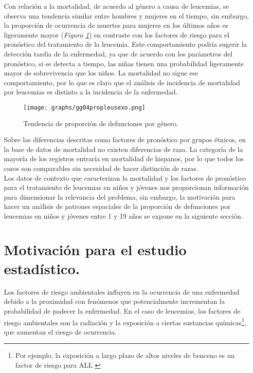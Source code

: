 \documentclass[11pt, oneside]{book}
\begin{document}
Con relación a la mortalidad, de acuerdo al género a causa de leucemias, se observa una tendencia similar entre hombres y mujeres en el tiempo, sin embargo, la proporción de ocurrencia de muertes para mujeres en los últimos años es ligeramente mayor (\emph{Figura \ref{fig3.sexo}}) en contraste con los factores de riesgo para el pronóstico del tratamiento de la leucemia. Este comportamiento podría sugerir la detección tardía de la enfermedad, ya que de acuerdo con los parámetros del pronóstico, si se detecta a tiempo, las niñas tienen una probabilidad ligeramente mayor de sobrevivencia que los niños. La mortalidad no sigue ese comportamiento, por lo que es claro que el análisis de incidencia de mortalidad por leucemias es distinto a la incidencia de la enfermedad. \\

\begin{figure}[ht]
	  \centering
	  \texttt{[image: graphs/gg04propleusexo.png]}
  \caption{Tendencia de proporción de defunciones por género.}
  \label{fig3.sexo}
\end{figure}

Sobre las diferencias descritas como factores de pronóstico por grupos étnicos, en la base de datos de mortalidad no existen diferencias de raza. La categoría de la mayoría de los registros entraría en mortalidad de hispanos, por lo que todos los casos son comparables sin necesidad de hacer distinción de razas.\\

Los datos de contexto que caracterizan la mortalidad y los factores de pronóstico para el tratamiento de leucemias en niños y jóvenes nos proporcionan información para dimensionar la relevancia del problema, sin embargo, la motivación para hacer un análisis de patrones espaciales de la proporción de defunciones por leucemias en niños y jóvenes entre 1 y 19 años se expone en la siguiente sección.


\section{Motivación para el estudio estadístico.}

Los factores de riesgo ambientales influyen en la ocurrencia de una enfermedad debido a la proximidad con fenómenos que potencialmente incrementan la probabilidad de padecer la enfermedad. En el caso de leucemias, los factores de riesgo ambientales son la radiación y la exposición a ciertas sustancias químicas\footnote{Por ejemplo, la exposición a largo plazo de altos niveles de benceno es un factor de riesgo para ALL \cite{cancer}}, que aumentan el riesgo de ocurrencia.\\
\end{document}
